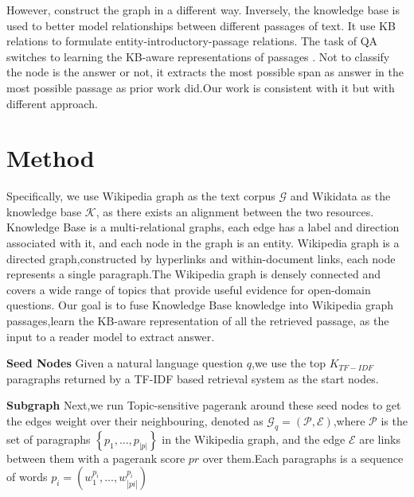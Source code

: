 \documentclass[sigconf]{acmart}
\begin{document}
	However,\cite{min2019knowledge} construct the graph in a different way.  Inversely, the knowledge base is used to better model relationships between different passages of text. It use KB relations to formulate entity-introductory-passage relations. The task of QA  switches to learning the KB-aware representations of  passages . Not to classify the node is the answer or not, it extracts the most possible span as answer in the most possible passage as prior work did.Our work is consistent with it but with different approach.
	
	\section{Method}
	Specifically, we use Wikipedia graph\cite{asai2019learning}
	as the text corpus $\mathcal{G}$ and Wikidata\cite{vrandevcic2014wikidata}  as the knowledge base $\mathcal{K}$, as there exists an alignment between the two resources.
	Knowledge Base is a multi-relational graphs, each edge has a label and direction associated with it, and each node in the graph is an entity.
	Wikipedia graph\cite{asai2019learning} is a directed graph,constructed by hyperlinks and within-document links, each node represents a single paragraph.The Wikipedia graph is densely connected and covers a wide range of topics that provide useful evidence for open-domain questions.
	Our goal is to fuse Knowledge Base knowledge into Wikipedia graph passages,learn the KB-aware representation of all the retrieved passage, as the input to a reader model to extract answer.
	
	\textbf{Seed Nodes}  Given a natural language question $q$,we use the top $K_{TF-IDF}$ paragraphs  returned by a TF-IDF based retrieval system as the start nodes. 
	
	\textbf{Subgraph}
	Next,we run Topic-sensitive pagerank\cite{haveliwala2003topic} around these seed nodes  to get the edges weight over their neighbouring, denoted as  $\mathcal{G}_q = (\mathcal{P},\mathcal{E})$,where $\mathcal{P}$ is the set of paragraphs $\left\{p_1,...,p_{|p|}\right\}$ in the Wikipedia graph, and the edge $\mathcal{E}$ are links between them with a pagerank score $pr$ over them.Each paragraphs is a
	sequence of words $p_i = (w_1^{p_i},...,w_{|pi|}^{p_i})$
	
\end{document}
